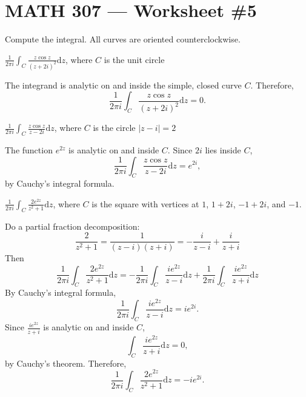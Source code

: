 \documentclass[12pt]{exam}
\newcommand{\D}{\displaystyle}
\newcommand{\dz}{\mathrm{d}z}
\newcommand{\cic}{\frac1{2\pi i}\int_C}
\begin{document}
\section*{MATH 307 --- Worksheet \#5 }

\begin{questions}
    \setlength\itemsep{1em}
    \setlength\parskip{1em}

    
    \question
    
    Compute the integral. All curves are oriented counterclockwise.

    \bigskip
    \begin{parts}
        \item $\D\cic \frac{z\cos z}{(z+2i)^2}\dz$, where $C$ is the unit circle
        
        \begin{solution}
            The integrand is analytic on and inside the simple, closed curve $C$. Therefore,
            $$\cic \frac{z\cos z}{(z+2i)^2}\dz=0.$$
        \end{solution}

        \item $\D\cic \frac{z\cos z}{z-2i}\dz$, where $C$ is the circle $|z-i|=2$

        \begin{solution}
            The function $e^{2z}$ is analytic on and inside $C$.
            Since $2i$ lies inside $C$,
            $$\cic \frac{z\cos z}{z-2i}\dz = e^{2i},$$
            by Cauchy's integral formula.
        \end{solution}

        \item $\D\cic \frac{2e^{2z}}{z^2+1}\dz$, where $C$ is the square with vertices at $1$, $1+2i$, $-1+2i$, and $-1$.
        
        \begin{solution}
        Do a partial fraction decomposition:
        \[
            \frac{2}{z^2+1} = \frac1{(z-i)(z+i)} = -\frac i{z-i} + \frac i{z+i}
        \]
        Then
        $$\cic \frac{2e^{2z}}{z^2+1}\dz
        = -\cic\frac{i  e^{2z}}{z-i}\dz + \cic\frac{i  e^{2z}}{z+i}\dz$$
        By Cauchy's integral formula,
        $$
        \cic\frac{i  e^{2z}}{z-i}\dz = i e^{2i}.
        $$
        Since $\D\frac{i  e^{2z}}{z+i}$ is analytic on and inside $C$, 
        $$
        \int_C\frac{i  e^{2z}}{z+i}\dz=0,
        $$
        by Cauchy's theorem.
        Therefore,
        $$
        \cic \frac{2e^{2z}}{z^2+1}\dz = -i e^{2i}.
        $$
        \end{solution}
        

\end{parts}
\end{questions}
\end{document}
